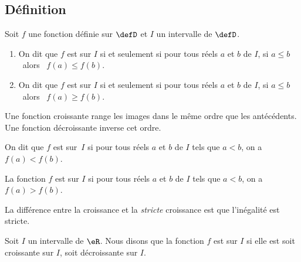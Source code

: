 %

\subsection{Définition}

\begin{definition}
      Soit $f$ une fonction définie sur $\defD$ et $I$ un
      intervalle de $\defD$.\\[-2ex]
      \begin{enumerate}
          \item On dit que $f$ est  sur $I$
        si et seulement si pour tous réels $a$ et $b$ de $I$, 
        si $a\leq b$ \ alors \ $f(a)\leq f(b)$.
    \item On dit que $f$ est  sur $I$
        si et seulement si pour tous réels $a$ et $b$ de $I$, 
        si $a\leq b$ \ alors \ $f(a)\geq f(b)$. 
      \end{enumerate}
\end{definition}


\begin{remark}
    Une fonction croissante range les images dans le même ordre que les antécédents. Une fonction décroissante inverse cet ordre. 
\end{remark}


\begin{definition}
    On dit que $f$ est  sur~$I$
  si pour tous réels $a$ et $b$ de $I$ tels que $a<b$, on a $f(a)<f(b)$.

  La fonction \( f\) est  sur \( I\) si pour tous réels $a$ et $b$ de $I$ tels que $a<b$, on a $f(a)>f(b)$.
\end{definition}
La différence entre la croissance et la \emph{stricte} croissance est que l'inégalité est stricte.

\begin{definition}
    Soit \( I\) un intervalle de \( \eR\). Nous disons que la fonction \( f\) est  sur $I$ si elle est soit croissante sur $I$, soit décroissante sur $I$.
\end{definition}

